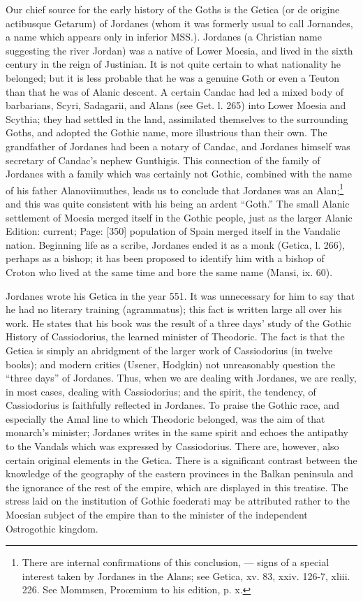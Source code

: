 Our chief source for the early history of the Goths is the Getica (or de origine actibusque Getarum) of Jordanes (whom it was formerly usual to call Jornandes, a name which appears only in inferior MSS.). Jordanes (a Christian name suggesting the river Jordan) was a native of Lower Moesia, and lived in the sixth century in the reign of Justinian. It is not quite certain to what nationality he belonged; but it is less probable that he was a genuine Goth or even a Teuton than that he was of Alanic descent. A certain Candac had led a mixed body of barbarians, Scyri, Sadagarii, and Alans (see Get. l. 265) into Lower Moesia and Scythia; they had settled in the land, assimilated themselves to the surrounding Goths, and adopted the Gothic name, more illustrious than their own. The grandfather of Jordanes had been a notary of Candac, and Jordanes himself was secretary of Candac\texthebrew{}’s nephew Gunthigis. This connection of the family of Jordanes with a family which was certainly not Gothic, combined with the name of his father Alanoviimuthes, leads us to conclude that Jordanes was an Alan;\footnote{There are internal confirmations of this conclusion, \texthebrew{—} signs of a special interest taken by Jordanes in the Alans; see Getica, xv. 83, xxiv. 126-7, xliii. 226. See Mommsen, Proœmium to his edition, p. x.} and this was quite consistent with his being an ardent \texthebrew{“}Goth.\texthebrew{}” The small Alanic settlement of Moesia merged itself in the Gothic people, just as the larger Alanic Edition: current; Page: [350] population of Spain merged itself in the Vandalic nation. Beginning life as a scribe, Jordanes ended it as a monk (Getica, l. 266), perhaps as a bishop; it has been proposed to identify him with a bishop of Croton who lived at the same time and bore the same name (Mansi, ix. 60).

Jordanes wrote his Getica in the year 551. It was unnecessary for him to say that he had no literary training (agrammatus); this fact is written large all over his work. He states that his book was the result of a three days\texthebrew{}’ study of the Gothic History of Cassiodorius, the learned minister of Theodoric. The fact is that the Getica is simply an abridgment of the larger work of Cassiodorius (in twelve books); and modern critics (Usener, Hodgkin) not unreasonably question the \texthebrew{“}three days\texthebrew{}” of Jordanes. Thus, when we are dealing with Jordanes, we are really, in most cases, dealing with Cassiodorius; and the spirit, the tendency, of Cassiodorius is faithfully reflected in Jordanes. To praise the Gothic race, and especially the Amal line to which Theodoric belonged, was the aim of that monarch\texthebrew{}’s minister; Jordanes writes in the same spirit and echoes the antipathy to the Vandals which was expressed by Cassiodorius. There are, however, also certain original elements in the Getica. There is a significant contrast between the knowledge of the geography of the eastern provinces in the Balkan peninsula and the ignorance of the rest of the empire, which are displayed in this treatise. The stress laid on the institution of Gothic foederati may be attributed rather to the Moesian subject of the empire than to the minister of the independent Ostrogothic kingdom.


